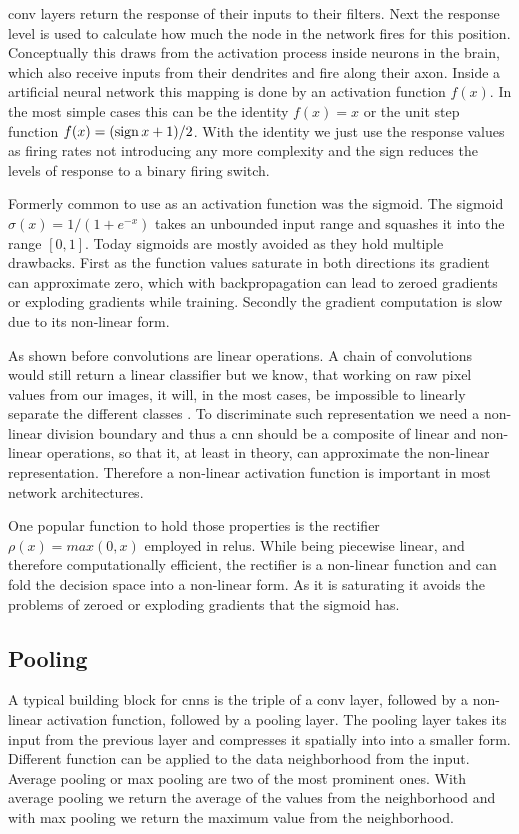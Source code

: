 \gls{conv} layers return the response of their inputs to their filters. Next the response level is used to calculate how much the node in the network fires for this position. Conceptually this draws from the activation process inside neurons in the brain, which also receive inputs from their dendrites and fire along their axon. Inside a artificial neural network this mapping is done by an activation function $f(x)$. In the most simple cases this can be the identity $f(x) = x$ or the unit step function $f(x) = (\operatorname{sign} x + 1) / 2$. With the identity we just use the response values as firing rates not introducing any more complexity and the sign reduces the levels of response to a binary firing switch.

Formerly common to use as an activation function was the sigmoid. The sigmoid $\sigma(x) = 1/(1+e^{-x})$  takes an unbounded input range and squashes it into the range $[0, 1]$. Today sigmoids are mostly avoided as they hold multiple drawbacks. First as the function values saturate in both directions its gradient can approximate zero, which with backpropagation can lead to zeroed gradients or exploding gradients while training. Secondly the gradient computation is slow due to its non-linear form.

As shown before convolutions are linear operations. A chain of convolutions would still return a linear classifier but we know, that working on raw pixel values from our images, it will, in the most cases, be impossible to linearly separate the different classes \citep{lecun_deep_2015}. To discriminate such representation we need a non-linear division boundary and thus a \gls{cnn} should be a composite of linear and non-linear operations, so that it, at least in theory, can approximate the non-linear representation. Therefore a non-linear activation function is important in most network architectures.

One popular function to hold those properties is the rectifier $\rho(x) = max(0, x)$  employed in \glspl{relu}. While being piecewise linear, and therefore computationally efficient, the rectifier is a non-linear function and can fold the decision space into a non-linear form.  As it is saturating it avoids the problems of zeroed or exploding gradients that the sigmoid has.

\subsection{Pooling}
\label{sub:concepts:nn:pooling}
A typical building block for \glspl{cnn} is the triple of a \gls{conv} layer, followed by a non-linear activation function, followed by a pooling layer. The pooling layer takes its input from the previous layer and compresses it spatially into into a smaller form. Different function can be applied to the data neighborhood from the input. Average pooling \citep{lecun_handwritten_1990} or max pooling \citep{zhou_computation_1988} are two of the most prominent ones. With average pooling we return the average of the values from the neighborhood and with max pooling we return the maximum value from the neighborhood.


